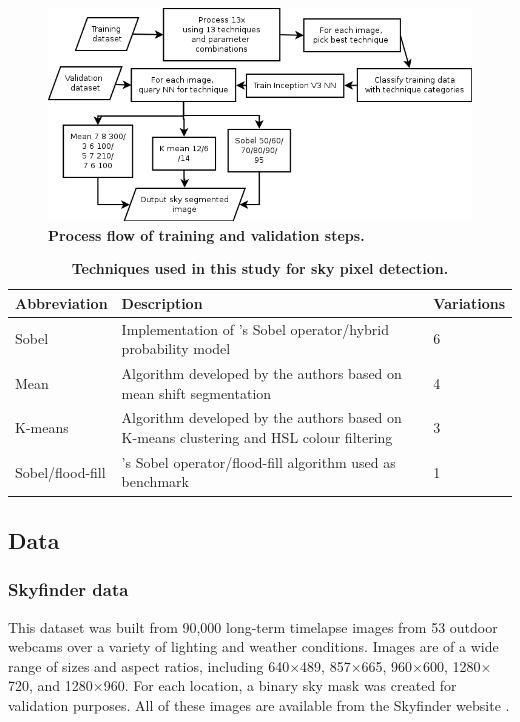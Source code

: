 \documentclass[final,3p,times,authoryear]{elsarticle}
\begin{document}
\begin{figure}
\centering    
\includegraphics[scale=0.60]{Images/TrainingProcessDiagram}
\caption{\bf Process flow of training and validation steps.}    
 \label{fig:process}  
\end{figure} 

\begin{table}[!htbp]
\caption{\bf Techniques used in this study for sky pixel detection.  \label{tab:techniques}}     
\begin{tabular}{ l l l}
\textbf{Abbreviation} & \textbf{Description} & \textbf{Variations}  \\ \hline
Sobel  & Implementation of \cite{Wang2015a}'s Sobel operator/hybrid probability model & 6 \\	
Mean & Algorithm developed by the authors based on mean shift segmentation &4 \\
K-means  & Algorithm developed by the authors based on K-means clustering and HSL colour filtering &3 \\
\hline
Sobel/flood-fill  & \cite{Middel2018}'s Sobel operator/flood-fill algorithm used as benchmark &1 \\
\hline
\end{tabular}
\end{table}


\subsection{Data}\label{sec:data}

\subsubsection{Skyfinder data}\label{sec:finderdata}
This dataset was built from 90,000 long-term timelapse images from 53 outdoor webcams over a variety of lighting and weather conditions. Images are of a wide range of sizes and aspect ratios, including 640$\times$489, 857$\times$665, 960$\times$600, 1280$\times$720, and 1280$\times$960. For each location, a binary sky mask was created for validation purposes. All of these images are available from the Skyfinder website \citep{Mihail2015}.
\end{document}
